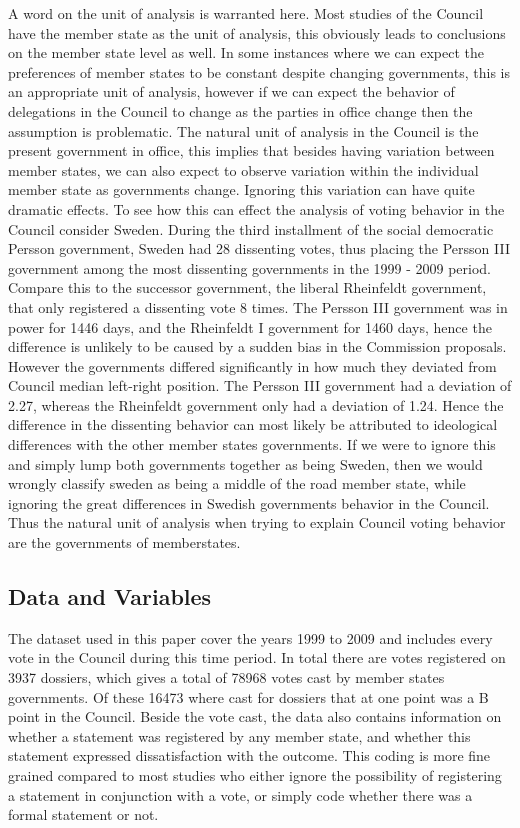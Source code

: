 A word on the unit of analysis is warranted here. Most studies of the Council have the member state as the unit of analysis, this obviously leads to conclusions on the member state level as well. In some instances where we can expect the preferences of member states to be constant despite changing governments, this is an appropriate unit of analysis, however if we can expect the behavior of delegations in the Council to change as the parties in office change then the assumption is problematic. The natural unit of analysis in the Council is the present government in office, this implies that besides having variation between member states, we can also expect to observe variation within the individual member state as governments change. Ignoring this variation can have quite dramatic effects. To see how this can effect the analysis of voting behavior in the Council consider Sweden. During the third installment of the social democratic Persson government, Sweden had 28 dissenting votes, thus placing the Persson III government among the most dissenting governments in the 1999 - 2009 period. Compare this to the successor government, the liberal Rheinfeldt government, that only registered a dissenting vote 8 times. The Persson III government was in power for 1446 days, and the Rheinfeldt I government for 1460 days, hence the difference is unlikely to be caused by a sudden bias in the Commission proposals. However the governments differed significantly in how much they deviated from Council median left-right position. The Persson III government had a deviation of 2.27, whereas the Rheinfeldt government only had a deviation of 1.24. Hence the difference in the dissenting behavior can most likely be attributed to ideological differences with the other member states governments. If we were to ignore this and simply lump both governments together as being Sweden, then we would wrongly classify sweden as being a middle of the road member state, while ignoring the great differences in Swedish governments behavior in the Council. Thus the natural unit of analysis when trying to explain Council voting behavior are the governments of memberstates. 


\subsection{Data and Variables}
The dataset used in this paper cover the years 1999 to 2009 and includes every vote in the Council during this time period. In total there are votes registered on 3937 dossiers, which gives a total of 78968 votes cast by member states governments. Of these 16473 where cast for dossiers that at one point was a B point in the Council. Beside the vote cast, the data also contains information on whether a statement was registered by any member state, and whether this statement expressed dissatisfaction with the outcome. This coding is more fine grained compared to most studies who either ignore the possibility of registering a statement in conjunction with a vote, or simply code whether there was a formal statement or not.

